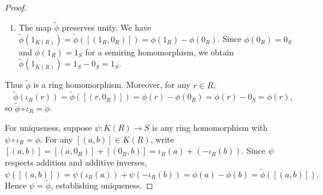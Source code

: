\begin{proof}
\begin{enumerate}
    \item The map $\widetilde{\phi}$ preserves unity. We have $\widetilde{\phi}(1_{K(R)}) = \widetilde{\phi}([(1_R, 0_R)]) = \phi(1_R) - \phi(0_R)$. Since $\phi(0_R) = 0_S$ and $\phi(1_R) = 1_S$ for a semiring homomorphism, we obtain $\widetilde{\phi}(1_{K(R)}) = 1_S - 0_S = 1_S$.
\end{enumerate}

Thus $\widetilde{\phi}$ is a ring homomorphism. Moreover, for any $r \in R$,
$$\widetilde{\phi}(\iota_R(r)) = \widetilde{\phi}([(r, 0_R)]) = \phi(r) - \phi(0_R) = \phi(r) - 0_S = \phi(r),$$
so $\widetilde{\phi} \circ \iota_R = \phi$.

For uniqueness, suppose $\psi: K(R) \to S$ is any ring homomorphism with $\psi \circ \iota_R = \phi$. For any $[(a,b)] \in K(R)$, write $[(a,b)] = [(a,0_R)] + [(0_R,b)] = \iota_R(a) + (-\iota_R(b))$. Since $\psi$ respects addition and additive inverses,
$$\psi([(a,b)]) = \psi(\iota_R(a)) + \psi(-\iota_R(b)) = \phi(a) - \phi(b) = \widetilde{\phi}([(a,b)]).$$
Hence $\psi = \widetilde{\phi}$, establishing uniqueness.
\end{proof}